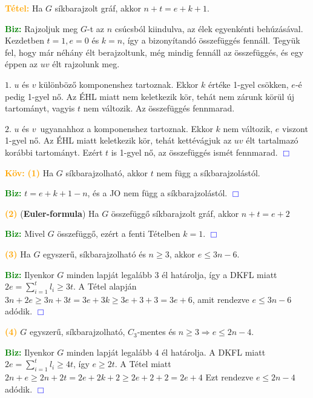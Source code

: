 \documentclass[../../szobeli.tex]{subfiles}
\begin{document}
\begin{itemize}
        \textcolor{orange}{\textbf{Tétel:}} Ha $G$ síkbarajzolt gráf, akkor $n+t=e+k+1$. 

        \textcolor{green}{\textbf{Biz:}} Rajzoljuk meg $G$-t az $n$ csúcsból kiindulva, az élek egyenkénti behúzásával. Kezdetben $t=1, e=0$ és $k=n$, így a bizonyítandó összefüggés fennáll. Tegyük fel, hogy már néhány élt berajzoltunk, még mindig fennáll az összefüggés, és egy éppen az $uv$ élt rajzolunk meg.

        $\boxed{1.}$ $u$ és $v$ különböző komponenshez tartoznak. Ekkor $k$ értéke 1-gyel csökken, $e$-é pedig 1-gyel nő. Az ÉHL miatt nem keletkezik kör, tehát nem zárunk körül új tartományt, vagyis $t$ nem változik. Az összefüggés fennmarad.

        $\boxed{2.}$ $u$ és $v$ ugyanahhoz a komponenshez tartoznak. Ekkor $k$ nem változik, $e$ viszont 1-gyel nő. Az ÉHL miatt keletkezik kör, tehát kettévágjuk az $uv$ élt tartalmazó korábbi tartományt. Ezért $t$ is 1-gyel nő, az összefüggés ismét fennmarad. \textcolor{blue}{$\Box$}

        \textcolor{orange}{\textbf{Köv:}} \textcolor{orange}{\textbf{(1)}} Ha $G$ síkbarajzolható, akkor $t$ nem függ a síkbarajzolástól.

        \textcolor{green}{\textbf{Biz:}} $t = e + k + 1 - n$, és a JO nem függ a síkbarajzolástól. \textcolor{blue}{$\Box$}

        \textcolor{orange}{\textbf{(2)}} (\textbf{Euler-formula}) Ha $G$ összefüggő síkbarajzolt gráf, akkor $n + t = e + 2$

        \textcolor{green}{\textbf{Biz:}} Mivel $G$ összefüggő, ezért a fenti Tételben $k = 1$. \textcolor{blue}{$\Box$}

        \textcolor{orange}{\textbf{(3)}} Ha $G$ egyszerű, síkbarajzolható és $n \geq 3$, akkor $e \leq 3n - 6$.

        \textcolor{green}{\textbf{Biz:}} Ilyenkor $G$ minden lapját legalább 3 él határolja, így a DKFL miatt $2e = \sum_{i=1}^{t} l_i \geq 3t$. A Tétel alapján $3n + 2e \geq 3n + 3t = 3e + 3k \geq 3e + 3 + 3 = 3e + 6$, amit rendezve $e \leq 3n - 6$ adódik. \textcolor{blue}{$\Box$}

        \textcolor{orange}{\textbf{(4)}} $G$ egyszerű, síkbarajzolható, $C_3$-mentes és $n \geq 3 \Rightarrow e \leq 2n - 4$. 

        \textcolor{green}{\textbf{Biz:}} Ilyenkor $G$ minden lapját legalább 4 él határolja. A DKFL miatt $2e = \sum_{i=1}^{t}l_i \geq 4t$, így $e \geq 2t$. A Tétel miatt $2n + e \geq 2n + 2t = 2e + 2k + 2 \geq 2e + 2 + 2 = 2e + 4$ Ezt rendezve $e \leq 2n - 4$ adódik. \textcolor{blue}{$\Box$}


\end{itemize}
\end{document}
